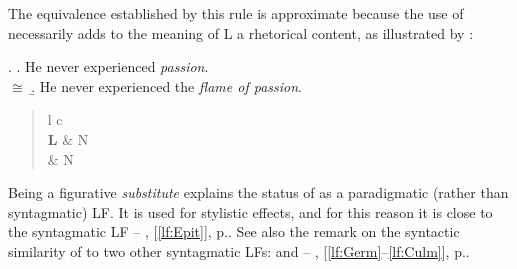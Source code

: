 The equivalence established by this rule is approximate because the use of  necessarily adds to the meaning of L a rhetorical content, as illustrated by \Next[a--b]:

\begingroup
\small

\ex. \a. He never experienced \emph{passion}.\\
         $\cong$
     \b. He never experienced the \emph{flame of passion}.

\endgroup

\begin{quote}
\begingroup
\small
\begin{tabular}{ l c }
   \midrule
    \\
   \midrule
   \textbf{L} & N \\
   \midrule
   \textbf{} & N \\
   \midrule
\end{tabular}
\endgroup
\end{quote}

Being a figurative \emph{substitute} explains the status of  as a paradigmatic (rather than syntagmatic) LF. It is used for stylistic effects, and for this reason it is close to the syntagmatic LF  -- , [\ref{lf:Epit}], p.\thinspace\pageref{lf:Epit}. See also the remark on the syntactic similarity of  to two other syntagmatic LFs:  and  -- , [\ref{lf:Germ}--\ref{lf:Culm}], p.\thinspace\pageref{txt:Figur-Germ-Culm}.


